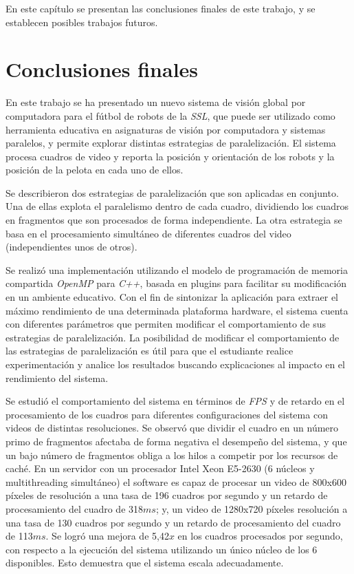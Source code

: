 
En este capítulo se presentan las conclusiones finales de este trabajo, y se
establecen posibles trabajos futuros.

\section{Conclusiones finales}

\label{concluciones}

En este trabajo se ha presentado un nuevo sistema de visión global por
computadora para el fútbol de robots de la \emph{SSL}, que puede ser utilizado
como herramienta educativa en asignaturas de visión por computadora y sistemas
paralelos, y permite explorar distintas estrategias de paralelización. El
sistema procesa cuadros de video y reporta la posición y orientación de los
robots y la posición de la pelota en cada uno de ellos.

Se describieron dos estrategias de paralelización que son aplicadas en conjunto.
Una de ellas explota el paralelismo dentro de cada cuadro, dividiendo los
cuadros en fragmentos que son procesados de forma independiente. La otra
estrategia se basa en el procesamiento simultáneo de diferentes cuadros del
video (independientes unos de otros).

Se realizó una implementación utilizando el modelo de programación de memoria
compartida \emph{OpenMP} para \emph{C++}, basada en plugins para facilitar su
modificación en un ambiente educativo. Con el fin de sintonizar la aplicación
para extraer el máximo rendimiento de una determinada plataforma hardware, el
sistema cuenta con diferentes parámetros que permiten modificar el
comportamiento de sus estrategias de paralelización. La posibilidad de modificar
el comportamiento de las estrategias de paralelización es útil para que el
estudiante realice experimentación y analice los resultados buscando
explicaciones al impacto en el rendimiento del sistema.

Se estudió el comportamiento del sistema en términos de \emph{FPS} y de retardo
en el procesamiento de los cuadros para diferentes configuraciones del sistema
con videos de distintas resoluciones. Se observó que dividir el cuadro
en un número primo de fragmentos afectaba de forma negativa el desempeño del
sistema, y que un bajo número de fragmentos obliga a los hilos a competir por
los recursos de caché. En un servidor con un procesador Intel Xeon E5-2630 (6
núcleos y multithreading simultáneo) el software es capaz de procesar un video
de 800x600 píxeles de resolución a una tasa de 196 cuadros por segundo y un
retardo de procesamiento del cuadro de 318$ms$; y, un video de 1280x720 píxeles
resolución a una tasa de 130 cuadros por segundo y un retardo de procesamiento
del cuadro de 113$ms$. Se logró una mejora de 5,42$x$ en los cuadros procesados
por segundo, con respecto a la ejecución del sistema utilizando un único núcleo
de los 6 disponibles. Esto demuestra que el sistema escala adecuadamente.

